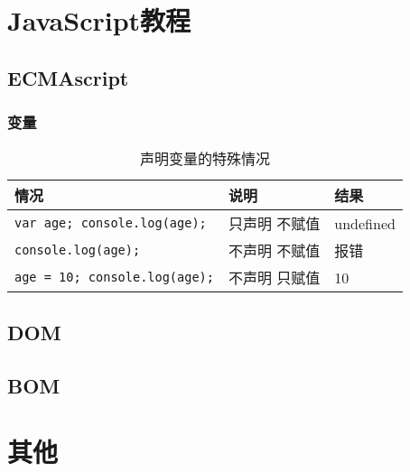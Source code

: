\documentclass{book}
\begin{document}
\part{JavaScript教程}
\chapter{ECMAscript}
\section{变量}
\begin{table}
\caption{声明变量的特殊情况}
\centering
\begin{tabular}{lll}
\hline
情况&说明&结果\\
\hline
\verb|var age; console.log(age);|&只声明 不赋值&undefined\\
\verb|console.log(age);|&不声明 不赋值&报错\\
\verb|age = 10; console.log(age);|&不声明 只赋值&10\\
\hline
\end{tabular}
\end{table}
\chapter{DOM}
\chapter{BOM}
\part{其他}

\end{document}
